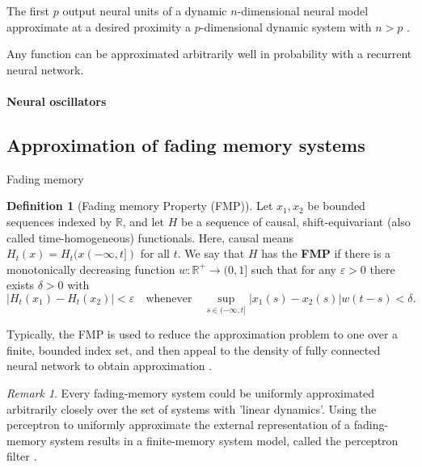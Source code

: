 \documentclass{article}
\theoremstyle{definition}
\newtheorem{definition}{Definition}
\theoremstyle{remark}
\newtheorem{remark}{Remark}
\begin{document}
The first $p$ output neural units of a dynamic $n$-dimensional neural model approximate at a desired proximity a $p$-dimensional dynamic system with $n > p$ \citep{kambhampati2000approximation}.

Any function can be approximated arbitrarily well in probability with a recurrent neural network\citep{hammer2000approximation}. %


\paragraph{Neural oscillators}
\citep{lanthaler2023neuraloscillators}

\subsection{Approximation of fading memory systems}
Fading memory \citep{boyd1985fading}


\begin{definition}[Fading memory Property (FMP)]
Let $x_1, x_2$ be bounded sequences indexed by $\mathbb{R}$, and let $H$ be a sequence of causal, shift-equivariant (also called time-homogeneous) functionals.
Here, causal means $H_t(x) = H_t(x(-\infty,t])$ for all $t$.
We say that $H$ has the \textbf{FMP} if there is a monotonically decreasing function $w : \mathbb{R}^+ \to (0, 1]$ such that for any $\varepsilon > 0$ there exists $\delta > 0$ with 
\[
|H_t(x_1) - H_t(x_2)| < \varepsilon \quad \text{whenever} \quad \sup_{s \in (-\infty, t]} |x_1(s) - x_2(s)| w(t - s) < \delta.
\]
\end{definition}

 Typically, the FMP is used to reduce the approximation problem to one over a finite, bounded index set, and then appeal to the density of fully connected neural network to obtain approximation \citep{gonon2021fading}. %


\begin{remark}
Every fading-memory system could be uniformly approximated arbitrarily closely over the set of systems with 'linear dynamics'\citep{matthews1993approximating}. %
Using the perceptron to uniformly approximate the external representation of a fading-memory system results in a finite-memory system model, called the perceptron filter \citep{matthews1993approximating}.
\end{remark}
\end{document}

